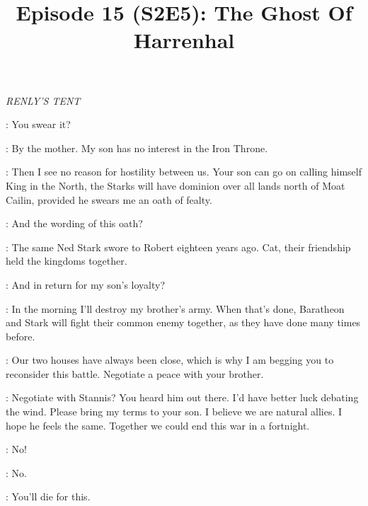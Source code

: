 

\title{Episode 15 (S2E5): The Ghost Of Harrenhal}
\author{}
\date{}
\maketitle






\scene

\textit{RENLY'S TENT} 


\RENLY: You swear it? 

\CATELYN: By the mother. My son has no interest in the Iron Throne. 

\RENLY: Then I see no reason for hostility between us. Your son can go on calling himself King in the North, the Starks will have dominion over all lands north of Moat Cailin, provided he swears me an oath of fealty. 

\CATELYN: And the wording of this oath? 

\RENLY: The same Ned Stark swore to Robert eighteen years ago. Cat, their friendship held the kingdoms together. 

\CATELYN: And in return for my son's loyalty? 

\RENLY: In the morning I'll destroy my brother's army. When that's done, Baratheon and Stark will fight their common enemy together, as they have done many times before. 

\CATELYN: Our two houses have always been close, which is why I am begging you to reconsider this battle. Negotiate a peace with your brother. 

\RENLY: Negotiate with Stannis? You heard him out there. I'd have better luck debating the wind. Please bring my terms to your son. I believe we are natural allies. I hope he feels the same. Together we could end this war in a fortnight. 


\BRIENNE: No! 


\BRIENNE: No. 



\GUARD:  You'll die for this. 

